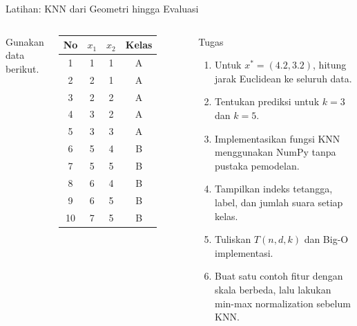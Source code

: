 \documentclass[aspectratio=169,11pt]{beamer}
\begin{document}
\begin{frame}{Latihan: KNN dari Geometri hingga Evaluasi}
\scriptsize
\begin{columns}[T]
Gunakan data berikut.
\vspace{1mm}
\centering
\begin{tabular}{c c c c}
\toprule
No & $x_1$ & $x_2$ & Kelas \\
\midrule
1 & 1 & 1 & A \\
2 & 2 & 1 & A \\
3 & 2 & 2 & A \\
4 & 3 & 2 & A \\
5 & 3 & 3 & A \\
6 & 5 & 4 & B \\
7 & 5 & 5 & B \\
8 & 6 & 4 & B \\
9 & 6 & 5 & B \\
10 & 7 & 5 & B \\
\bottomrule
\end{tabular}
\begin{block}{Tugas}
\begin{enumerate}
  \item Untuk $x^*=(4.2,3.2)$, hitung jarak Euclidean ke seluruh data.
  \item Tentukan prediksi untuk $k=3$ dan $k=5$.
  \item Implementasikan fungsi KNN menggunakan NumPy tanpa pustaka pemodelan.
  \item Tampilkan indeks tetangga, label, dan jumlah suara setiap kelas.
  \item Tuliskan $T(n,d,k)$ dan Big-O implementasi.
  \item Buat satu contoh fitur dengan skala berbeda, lalu lakukan min-max normalization sebelum KNN.
\end{enumerate}
\end{block}
\end{columns}
\end{frame}
\end{document}
